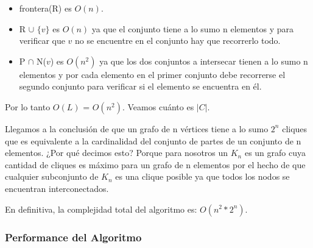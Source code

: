 \begin{itemize}
 \item frontera(R) es $O(n)$.
 \item R $\cup$ $\{v\}$ es $O(n)$ ya que el conjunto tiene a lo sumo n elementos y para verificar que $v$ no se encuentre en el conjunto hay que recorrerlo todo.
 \item P $\cap$ N($v$) es $O(n^2)$ ya que los dos conjuntos a intersecar tienen a lo sumo n elementos y por cada elemento en el primer conjunto debe recorrerse el segundo conjunto para verificar si el elemento se encuentra en él.
\end{itemize}

Por lo tanto $O(L)$ = $O(n^2)$. Veamos cuánto es $|C|$.


Llegamos a la conclusión de que un grafo de n vértices tiene a lo sumo $2^n$ cliques que es equivalente a la cardinalidad del conjunto de partes de un conjunto de n elementos. ¿Por qué decimos esto? Porque para nosotros un $K_n$ es un grafo cuya cantidad de cliques es máximo para un grafo de n elementos por el hecho de que cualquier subconjunto de $K_n$ es una clique posible ya que todos los nodos se encuentran interconectados.

En definitiva, la complejidad total del algoritmo es: $O(n^2*2^n)$.

\subsubsection{Performance del Algoritmo}



